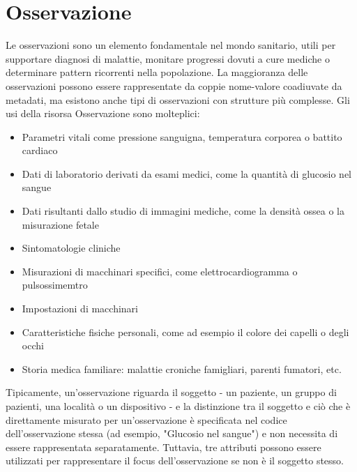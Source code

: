 \documentclass{article}
\begin{document}
\section{Osservazione}
Le osservazioni sono un elemento fondamentale nel mondo sanitario, utili per supportare diagnosi di malattie, monitare progressi
dovuti a cure mediche o determinare pattern ricorrenti nella popolazione.
La maggioranza delle osservazioni possono essere rappresentate da coppie nome-valore coadiuvate da metadati, ma esistono anche tipi di osservazioni con strutture più complesse.
Gli usi della risorsa Osservazione sono molteplici:
\begin{itemize}
    \item Parametri vitali come pressione sanguigna, temperatura corporea o battito cardiaco
    \item Dati di laboratorio derivati da esami medici, come la quantità di glucosio nel sangue
    \item Dati risultanti dallo studio di immagini mediche, come la densità ossea o la misurazione fetale
    \item Sintomatologie cliniche
    \item Misurazioni di macchinari specifici, come elettrocardiogramma o pulsossimemtro
    \item Impostazioni di macchinari
    \item Caratteristiche fisiche personali, come ad esempio il colore dei capelli o degli occhi
    \item Storia medica familiare: malattie croniche famigliari, parenti fumatori, etc.
\end{itemize}
Tipicamente, un'osservazione riguarda il soggetto - un paziente, un gruppo di pazienti, una località o un dispositivo - e la distinzione tra il soggetto e ciò che è direttamente
misurato per un'osservazione è specificata nel codice dell'osservazione stessa (ad esempio, "Glucosio nel sangue") e non necessita di essere rappresentata separatamente.
Tuttavia, tre attributi possono essere utilizzati per rappresentare il focus dell'osservazione se non è il soggetto stesso.
\end{document}
